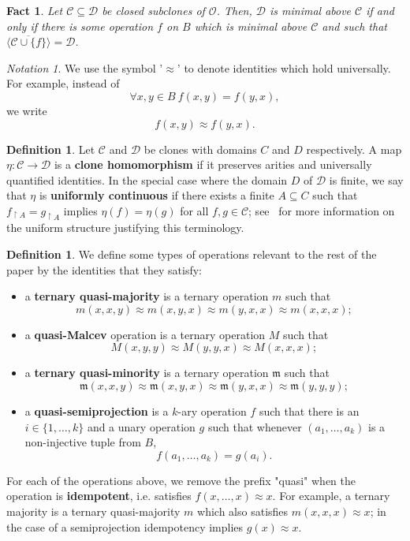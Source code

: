 \documentclass{article}
\newtheorem{fact}[theorem]{Fact}
\theoremstyle{remark}
\newtheorem{notation}[theorem]{Notation}
\theoremstyle{definition}
\newtheorem{definition}[theorem]{Definition}
\begin{document}
\begin{fact} Let $\mathcal{C}\subseteq\mathcal{D}$ be closed subclones of $\mathcal{O}$. Then, $\mathcal{D}$ is minimal above $\mathcal{C}$ if and only if there is some operation $f$ on $B$ which is minimal above $\mathcal{C}$ and such that $\overline{\langle \mathcal{C}\cup\{f\}\rangle}=\mathcal{D}$. 
\end{fact}

\begin{notation} We use the symbol '$\approx$' to denote identities which hold universally. For example, instead of
\[\forall x,y\in B \ f(x,y)=f(y,x),\]
we write
\[f(x,y)\approx f(y,x).\]
\end{notation}

\begin{definition} \label{def:clonehom} Let $\mathcal{C}$ and $\mathcal{D}$ be clones with domains $C$ and $D$ respectively. A map $\eta:\mathcal{C}\to\mathcal{D}$ is a \textbf{clone homomorphism} if it preserves arities and universally quantified identities. In the special case where the domain $D$ of $\mathcal{D}$ is finite, we say that $\eta$ is \textbf{uniformly continuous} if there exists a finite $A\subseteq C$ such that $f_{\upharpoonright A}=g_{\upharpoonright A}$ implies $\eta(f)=\eta(g)$ for all $f,g\in \mathcal{C}$; see~\cite{uniformbirkhoff} for more information on the uniform structure justifying this terminology.
\end{definition}


\begin{definition}\label{def:mainops} We define some types of operations relevant to the rest of the paper by the identities that they satisfy:
\begin{itemize}
    \item a \textbf{ternary quasi-majority} is a ternary operation $m$ such that 
\[m(x,x,y)\approx m(x,y,x)\approx m(y,x,x)\approx m(x,x,x);\]
\item a \textbf{quasi-Malcev} operation is a ternary operation $M$ such that
\[M(x,y,y)\approx M(y,y,x)\approx M(x,x,x);\]
    \item a \textbf{ternary quasi-minority} is a ternary operation $\mathfrak{m}$ such that 
\[\mathfrak{m}(x,x,y)\approx \mathfrak{m}(x,y,x)\approx \mathfrak{m}(y,x,x)\approx \mathfrak{m}(y,y,y);\]
\item a \textbf{quasi-semiprojection} is a $k$-ary operation $f$ such that there is an $i\in\{1, \dots, k\}$ and a unary operation $g$ such that whenever $(a_1, \dots, a_k)$ is a non-injective tuple from $B$,
\[f(a_1, \dots, a_k)= g(a_i).\]
\end{itemize}
For each of the operations above, we remove the prefix "quasi" when the operation is \textbf{idempotent}, i.e. satisfies $f(x, \dots, x)\approx x$. For example, a ternary majority is a ternary quasi-majority $m$ which also satisfies $m(x,x,x)\approx x$; in the case of a semiprojection idempotency  implies $g(x)\approx x
$.
\end{definition}
\end{document}
